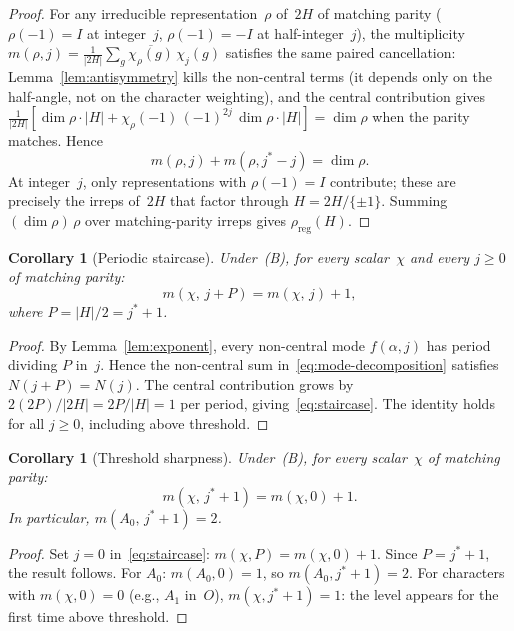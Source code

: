 \documentclass[12pt]{article}
\newtheorem{corollary}[theorem]{Corollary}
\theoremstyle{definition}
\theoremstyle{remark}
\begin{document}
\begin{proof}
  For any irreducible representation~$\rho$ of~$2H$
  of matching parity ($\rho(-1) = I$ at integer~$j$,
  $\rho(-1) = -I$ at half-integer~$j$), the
  multiplicity $m(\rho,j) = \frac{1}{|2H|}
  \sum_g \overline{\chi_\rho(g)}\,\chi_j(g)$
  satisfies the same paired cancellation:
  Lemma~\ref{lem:antisymmetry} kills the non-central
  terms (it depends only on the half-angle, not on
  the character weighting), and the central contribution
  gives
  $\frac{1}{|2H|}[\dim\rho \cdot |H|
  + \chi_\rho(-1)\,(-1)^{2j}\,\dim\rho \cdot |H|]
  = \dim\rho$
  when the parity matches.
  Hence
  \[
    m(\rho, j) + m(\rho, j^*{-}j) = \dim\rho.
  \]
  At integer~$j$, only representations with
  $\rho(-1) = I$ contribute; these are precisely the
  irreps of~$2H$ that factor through $H = 2H/\{\pm 1\}$.
  Summing $(\dim\rho)\,\rho$ over matching-parity irreps
  gives $\rho_{\mathrm{reg}}(H)$.
\end{proof}

\begin{corollary}[Periodic staircase]
  \label{cor:staircase}
  Under~\textup{(B)}, for every scalar~$\chi$ and
  every $j \ge 0$ of matching parity:
  \begin{equation}
    \label{eq:staircase}
    m(\chi,\, j + P) = m(\chi,\, j) + 1,
  \end{equation}
  where $P = |H|/2 = j^* + 1$.
\end{corollary}

\begin{proof}
  By Lemma~\ref{lem:exponent}, every non-central mode
  $f(\alpha, j)$ has period dividing $P$ in~$j$.
  Hence the non-central sum in~\eqref{eq:mode-decomposition}
  satisfies $N(j{+}P) = N(j)$.
  The central contribution grows by
  $2(2P)/|2H| = 2P/|H| = 1$ per period,
  giving~\eqref{eq:staircase}.
  The identity holds for all $j \ge 0$, including above threshold.
\end{proof}

\begin{corollary}[Threshold sharpness]
  \label{cor:threshold}
  Under~\textup{(B)}, for every scalar~$\chi$ of
  matching parity:
  \begin{equation}
    \label{eq:threshold-sharp}
    m(\chi,\, j^*{+}1) = m(\chi, 0) + 1.
  \end{equation}
  In particular, $m(A_0,\, j^*{+}1) = 2$.
\end{corollary}

\begin{proof}
  Set $j = 0$ in~\eqref{eq:staircase}:
  $m(\chi, P) = m(\chi, 0) + 1$.
  Since $P = j^*{+}1$, the result follows.
  For $A_0$: $m(A_0, 0) = 1$, so
  $m(A_0, j^*{+}1) = 2$.
  For characters with $m(\chi, 0) = 0$
  (e.g., $A_1$ in~$O$),
  $m(\chi, j^*{+}1) = 1$: the level appears
  for the first time above threshold.
\end{proof}
\end{document}
